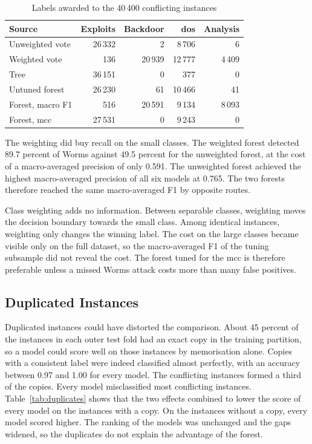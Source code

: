 \documentclass[conference]{IEEEtran}
\begin{document}
\begin{table}[t]
\centering
\caption{Labels awarded to the 40\,400 conflicting instances}
\label{tab:votes}
\small
\begin{tabular}{lrrrr}
\toprule
Source & Exploits & Backdoor & \acrshort{dos} & Analysis \\
\midrule
Unweighted vote & 26\,332 & 2 & 8\,706 & 6 \\
Weighted vote & 136 & 20\,939 & 12\,777 & 4\,409 \\
Tree & 36\,151 & 0 & 377 & 0 \\
Untuned forest & 26\,230 & 61 & 10\,466 & 41 \\
Forest, macro F1 & 516 & 20\,591 & 9\,134 & 8\,093 \\
Forest, \acrshort{mcc} & 27\,531 & 0 & 9\,243 & 0 \\
\bottomrule
\end{tabular}
\end{table}

The weighting did buy recall on the small classes. The weighted forest detected 89.7
percent of Worms against 49.5 percent for the unweighted forest, at the cost of a
macro-averaged precision of only 0.591. The unweighted forest achieved the highest
macro-averaged precision of all six models at 0.765. The two forests therefore
reached the same macro-averaged F1 by opposite routes.

Class weighting adds no information. Between separable classes, weighting moves the
decision boundary towards the small class. Among identical instances, weighting only
changes the winning label. The cost on the large classes became visible only on the
full dataset, so the macro-averaged F1 of the tuning subsample did not reveal the
cost. The forest tuned for the \gls{mcc} is therefore preferable unless a missed
Worms attack costs more than many false positives.

\subsection{Duplicated Instances}

Duplicated instances could have distorted the comparison. About 45 percent of the
instances in each outer test fold had an exact copy in the training partition, so a
model could score well on those instances by memorisation alone. Copies with a
consistent label were indeed classified almost perfectly, with an accuracy between
0.97 and 1.00 for every model. The conflicting instances formed a third of the copies. Every model misclassified most
conflicting instances. Table~\ref{tab:duplicates}
shows that the two effects combined to lower the score of every model on the
instances with a copy. On the instances without a copy, every model scored higher.
The ranking of the models was unchanged and the gaps widened, so the duplicates do
not explain the advantage of the forest.
\end{document}
